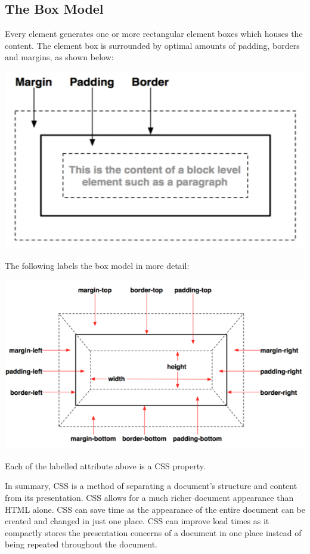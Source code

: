 \documentclass[a4paper, openany]{memoir}
\begin{document}
\subsection{The Box Model}
Every element generates one or more rectangular element boxes which houses the content. The element box is surrounded by optimal amounts of padding, borders and margins, as shown below:
\begin{center}
    \includegraphics[scale=0.8]{src/L11I1.PNG}
\end{center}
The following labels the box model in more detail:
\begin{center}
    \includegraphics[scale=0.8]{src/L11I2.PNG}
\end{center}
Each of the labelled attribute above is a CSS property.

\noindent In summary, CSS is a method of separating a document's structure and content from its presentation. CSS allows for a much richer document appearance than HTML alone. CSS can save time as the appearance of the entire document can be created and changed in just one place. CSS can improve load times as it compactly stores the presentation concerns of a document in one place instead of being repeated throughout the document.
\end{document}
